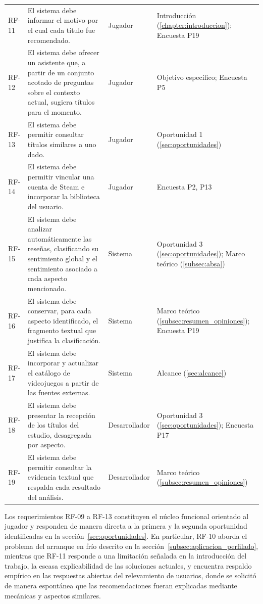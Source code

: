 \begin{longtable}{|>{\raggedright\arraybackslash}p{1.1cm}|>{\raggedright\arraybackslash}p{7.4cm}|>{\raggedright\arraybackslash}p{1.6cm}|>{\raggedright\arraybackslash}p{2.9cm}|}
	RF-11 & El sistema debe informar el motivo por el cual cada título fue recomendado. & Jugador & Introducción (\ref{chapter:introduccion}); Encuesta P19 \\
	RF-12 & El sistema debe ofrecer un asistente que, a partir de un conjunto acotado de preguntas sobre el contexto actual, sugiera títulos para el momento. & Jugador & Objetivo específico; Encuesta P5 \\
	RF-13 & El sistema debe permitir consultar títulos similares a uno dado. & Jugador & Oportunidad 1 (\ref{sec:oportunidades}) \\
	RF-14 & El sistema debe permitir vincular una cuenta de Steam e incorporar la biblioteca del usuario. & Jugador & Encuesta P2, P13 \\
	RF-15 & El sistema debe analizar automáticamente las reseñas, clasificando su sentimiento global y el sentimiento asociado a cada aspecto mencionado. & Sistema & Oportunidad 3 (\ref{sec:oportunidades}); Marco teórico (\ref{subsec:absa}) \\
	RF-16 & El sistema debe conservar, para cada aspecto identificado, el fragmento textual que justifica la clasificación. & Sistema & Marco teórico (\ref{subsec:resumen_opiniones}); Encuesta P19 \\
	RF-17 & El sistema debe incorporar y actualizar el catálogo de videojuegos a partir de las fuentes externas. & Sistema & Alcance (\ref{sec:alcance}) \\
	RF-18 & El sistema debe presentar la recepción de los títulos del estudio, desagregada por aspecto. & Desarrollador & Oportunidad 3 (\ref{sec:oportunidades}); Encuesta P17 \\
	RF-19 & El sistema debe permitir consultar la evidencia textual que respalda cada resultado del análisis. & Desarrollador & Marco teórico (\ref{subsec:resumen_opiniones}) \\
\end{longtable}

Los requerimientos RF-09 a RF-13 constituyen el núcleo funcional orientado al jugador y responden de manera directa a la primera y la segunda oportunidad identificadas en la sección~\ref{sec:oportunidades}. En particular, RF-10 aborda el problema del arranque en frío descrito en la sección~\ref{subsec:aplicacion_perfilado}, mientras que RF-11 responde a una limitación señalada en la introducción del trabajo, la escasa explicabilidad de las soluciones actuales, y encuentra respaldo empírico en las respuestas abiertas del relevamiento de usuarios, donde se solicitó de manera espontánea que las recomendaciones fueran explicadas mediante mecánicas y aspectos similares.

